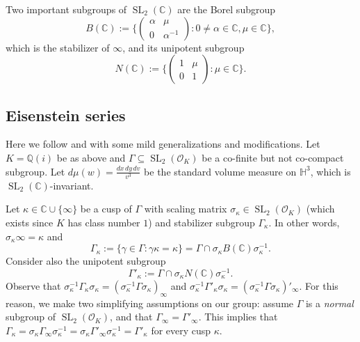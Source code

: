 \documentclass[12pt,reqno]{amsart}
\numberwithin{equation}{section}
\newcommand{\C}{\mathbb{C}}
\begin{document}
Two important subgroups of $\operatorname{SL}_2(\mathbb{C})$ are the Borel subgroup
\begin{equation*}
    B(\C) := \Big\{ \left(\begin{smallmatrix}
    \alpha & \mu \\
    0 & \alpha^{-1}
\end{smallmatrix}\right)  : 0\neq \alpha \in \C, \mu \in \C \Big \},
\end{equation*}
which is the stabilizer of $\infty$, and its unipotent subgroup
\begin{equation*}
    N(\C) := \Big\{ \left(\begin{smallmatrix}
    1 & \mu \\
    0 & 1
\end{smallmatrix}\right)  : \mu \in \C \Big \}.
\end{equation*}

\subsection{Eisenstein series} \label{metaeissec}
Here we follow \cite[\S2-\S4]{Pat1} and \cite[\S 2]{Dia} with some mild generalizations
and modifications. Let $K=\mathbb{Q}(i)$ be as above and
$\Gamma \subseteq \operatorname{SL}_2(\mathcal{O}_{K})$ be a co-finite but not co-compact subgroup.
Let $d\mu(w)=\frac{dx\, dy\, dv}{v^3}$ be the standard volume measure on $\mathbb{H}^3$, which is $\operatorname{SL}_2(\mathbb{C})$-invariant.

Let $\kappa \in \C \cup \{\infty\}$ be a cusp of $\Gamma$ with scaling matrix $\sigma_{\kappa} \in \operatorname{SL}_2(\mathcal{O}_{K})$ (which exists since $K$ has class number $1$)
and stabilizer subgroup $\Gamma_{\kappa}$. In other words, $\sigma_\kappa \infty = \kappa$ and
\begin{equation*}
    \Gamma_{\kappa} := \{ \gamma \in \Gamma : \gamma \kappa = \kappa\} = \Gamma \cap \sigma_\kappa B(\C) \sigma_\kappa^{-1}.
\end{equation*}
Consider also the unipotent subgroup
\begin{equation*}
    \Gamma'_\kappa := \Gamma \cap \sigma_\kappa N(\C) \sigma_\kappa^{-1}.
\end{equation*}
Observe that $\sigma_\kappa^{-1} \Gamma_\kappa \sigma_\kappa = (\sigma_\kappa^{-1} \Gamma \sigma_\kappa)_\infty$ and $\sigma_\kappa^{-1} \Gamma'_\kappa \sigma_\kappa = (\sigma_\kappa^{-1} \Gamma \sigma_\kappa)'_\infty$. For this reason, we make two simplifying assumptions on our group: assume $\Gamma$ is a \textit{normal} subgroup of $\operatorname{SL}_2(\mathcal{O}_K)$, and that $\Gamma_\infty = \Gamma'_\infty$. This implies that $\Gamma_{\kappa} = \sigma_\kappa \Gamma_\infty \sigma_\kappa^{-1} = \sigma_\kappa \Gamma'_\infty \sigma_\kappa^{-1} = \Gamma'_{\kappa}$ for every cusp $\kappa$.
\end{document}
